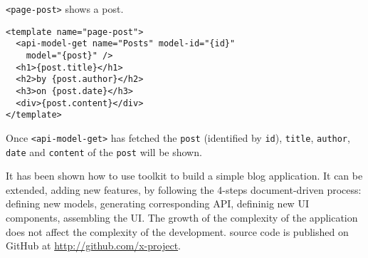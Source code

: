 \vspace{0.2cm}

\texttt{<page-post>} shows a post. 

\begin{lstlisting}[language=HTML5]
<template name="page-post">
  <api-model-get name="Posts" model-id="{id}" 
    model="{post}" />
  <h1>{post.title}</h1>
  <h2>by {post.author}</h2>
  <h3>on {post.date}</h3>
  <div>{post.content}</div>
</template>
\end{lstlisting}

Once \texttt{<api-model-get>} has fetched the \texttt{post} (identified by \texttt{id}),
\texttt{title}, \texttt{author}, \texttt{date} and \texttt{content} of the \texttt{post} will be shown.

\vspace{0.2cm}

It has been shown how to use  toolkit to build a simple blog application.
It can be extended, adding new features, by following the 4-steps document-driven process:  
defining new models, generating corresponding API, defininig new UI components, assembling the UI.
The growth of the complexity of the application does not affect the complexity of the development.
 source code is published on GitHub at \url{http://github.com/x-project}.